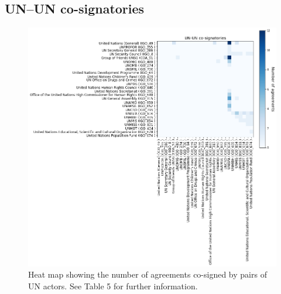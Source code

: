 \documentclass{article}
\begin{document}
\subsection{UN--UN co-signatories}

\begin{figure}[H]
\begin{center}
\includegraphics[scale=0.38]{./assets/figure_2.png}
\caption{Heat map showing the number of agreements co-signed by pairs of UN actors. See Table 5 for further information.}
\end{center}
\end{figure}
\end{document}
